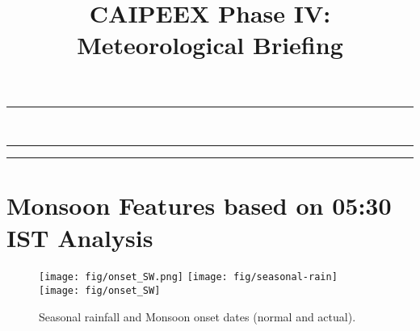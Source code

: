 \documentclass[12pt,a4paper]{article} %
\title{CAIPEEX Phase IV: Meteorological Briefing}%
\newcommand{\HorRule}[1]{\noindent\rule{\linewidth}{#1}} %
\newcommand{\SepRule}{\noindent	%
\begin{center}
\rule{250pt}{1pt} %
\end{center}
}
\begin{document}
\maketitle

\noindent\HorRule{3pt} \\[-0.75\baselineskip] %
\HorRule{1pt} %




%


\begin{multicols}{3} %
\tableofcontents
\SepRule %
\vspace{0.3cm}




\vfill
\section{Monsoon Features based on 05:30 IST Analysis}

\begin{itemize}

\end{itemize}

\end{multicols}

\begin{figure}[H]
\centering
\texttt{[image: fig/onset\_SW.png]}
\texttt{[image: fig/seasonal-rain]}
\texttt{[image: fig/onset\_SW]}
\caption{Seasonal rainfall and Monsoon onset dates (normal and actual).}
\end{figure}
\end{document}
